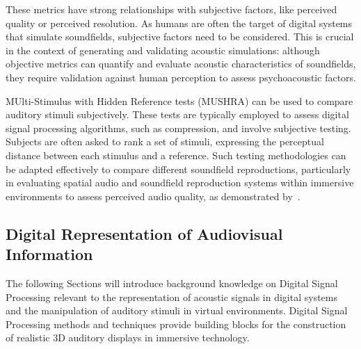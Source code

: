 These metrics have strong relationships with subjective factors, like perceived quality or perceived resolution. As humans are often the target of digital systems that simulate soundfields, subjective factors need to be considered. This is crucial in the context of generating and validating acoustic simulations: although objective metrics can quantify and evaluate acoustic characteristics of soundfields, they require validation against human perception to assess psychoacoustic factors.\par
MUlti-Stimulus with Hidden Reference tests (MUSHRA) can be used to compare auditory stimuli subjectively. These tests are typically employed to assess digital signal processing algorithms, such as compression, and involve subjective testing. Subjects are often asked to rank a set of stimuli, expressing the perceptual distance between each stimulus and a reference.
Such testing methodologies can be adapted effectively to compare different soundfield reproductions, particularly in evaluating spatial audio and soundfield reproduction systems within immersive environments to assess perceived audio quality, as demonstrated by~\cite{rummukainen2018audio}.

\subsection{Digital Representation of Audiovisual Information}
\label{sec:DSP-background}
The following Sections will introduce background knowledge on Digital Signal Processing relevant to the representation of acoustic signals in digital systems and the manipulation of auditory stimuli in virtual environments. Digital Signal Processing methods and techniques provide building blocks for the construction of realistic 3D auditory displays in immersive technology.

